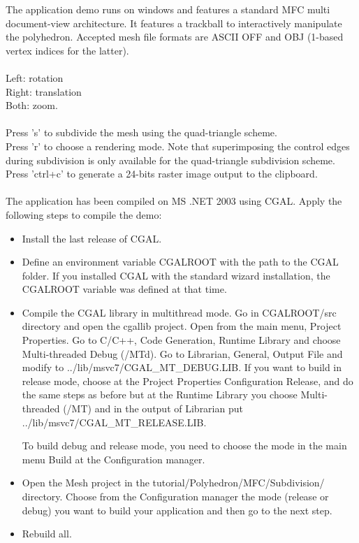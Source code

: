 The application demo runs on windows and features a standard MFC multi
document-view architecture. It features a trackball to interactively
manipulate the polyhedron. Accepted mesh file formats are ASCII OFF
and OBJ (1-based vertex indices for the latter). \\

\\
Left: rotation\\
Right: translation\\
Both: zoom.\\

\\
Press 's' to subdivide the mesh using the quad-triangle scheme.\\
Press 'r' to choose a rendering mode. Note that superimposing the
control edges during subdivision is only available for the
quad-triangle subdivision scheme.\\ Press 'ctrl+c' to generate a
24-bits raster image output to the clipboard.\\

\\
The application has been compiled on MS .NET 2003 using CGAL. Apply
the following steps to compile the demo:
\begin{itemize}
\item Install the last release of CGAL.
\item Define an environment variable CGALROOT with the path to the
CGAL folder. If you installed CGAL with the standard wizard installation, the CGALROOT variable was defined at that time.
\item Compile the CGAL library in multithread mode. Go in CGALROOT/src directory and open the cgallib project. Open from the main menu, Project Properties. Go to C/C++, Code Generation, Runtime Library and choose Multi-threaded Debug (/MTd). Go to Librarian, General, Output File and modify to ../lib/msvc7/CGAL\_MT\_DEBUG.LIB. If you want to build in release mode, choose at the Project Properties Configuration Release, and do the same steps as before but at the Runtime Library you choose Multi-threaded (/MT) and in the output of Librarian put ../lib/msvc7/CGAL\_MT\_RELEASE.LIB.

To build debug and release mode, you need to choose the mode in the main menu Build at the Configuration manager.

\item Open the Mesh project in the tutorial/Polyhedron/MFC/Subdivision/ directory. Choose from the Configuration manager the mode (release or debug) you want to build your application and then go to the next step.
\item Rebuild all.
\end{itemize}
